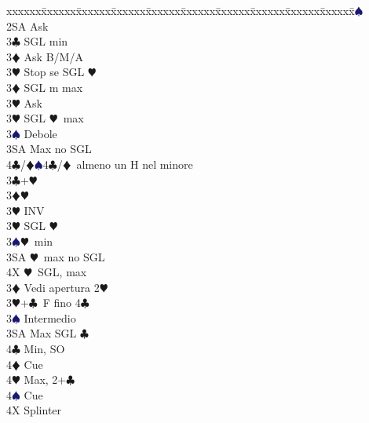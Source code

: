 \documentclass[a4paper,italian]{article}
\newcommand{\BC}{\textcolor{OliveGreen}{$\clubsuit$}}
\newcommand{\BD}{\textcolor{RedOrange}{$\vardiamondsuit$}}
\newcommand{\BH}{\textcolor{Red2}{$\varheartsuit${}}}
\newcommand{\BS}{\textcolor{MidnightBlue}{$\spadesuit${}}}
\newenvironment{bidtable}
{\begin{tabbing}

    xxxxxx\=xxxxxx\=xxxxxx\=xxxxxx\=xxxxxx\=xxxxxx\=xxxxxx\=xxxxxx\=xxxxxx\=xxxxxx\=\kill}
{\end{tabbing} }%
\begin{document}
\begin{multicols*}{2}
                                        \begin{bidtable}
                                            2\BS\+\\
                                            2SA \> Ask\+\\
                                            3\BC \> SGL min\+\\
                                            3\BD \> Ask B/M/A\\
                                            3\BH \> Stop se SGL \BH \-\\
                                            3\BD \> SGL m max\+\\
                                            3\BH \> Ask\-\\
                                            3\BH \> SGL \BH\ max\\
                                            3\BS \> Debole\\
                                            3SA \> Max no SGL\\
                                            4\BC/\BD {}\BS 4\BC /\BD\ almeno un H nel minore\-\\
                                            3\BC {}+\BH \+\\
                                            3\BD {}\BH \+\\
                                            3\BH \> INV\-\\
                                            3\BH \> SGL \BH \\
                                            3\BS {}\BH\ min\\
                                            3SA \BH\ max no SGL\\
                                            4X \BH\ SGL, max\-\\
                                            3\BD\> Vedi apertura 2\BH\\
                                            3\BH {}+\BC\ F fino 4\BC\+\\
                                            3\BS \> Intermedio\\
                                            3SA \> Max SGL \BC\\
                                            4\BC \> Min, SO\\
                                            4\BD \> Cue\\
                                            4\BH \> Max, 2+\BC\\
                                            4\BS \> Cue\-\\
                                            4X \> Splinter\-\\
                                        \end{bidtable}


\end{multicols*}
\end{document}
